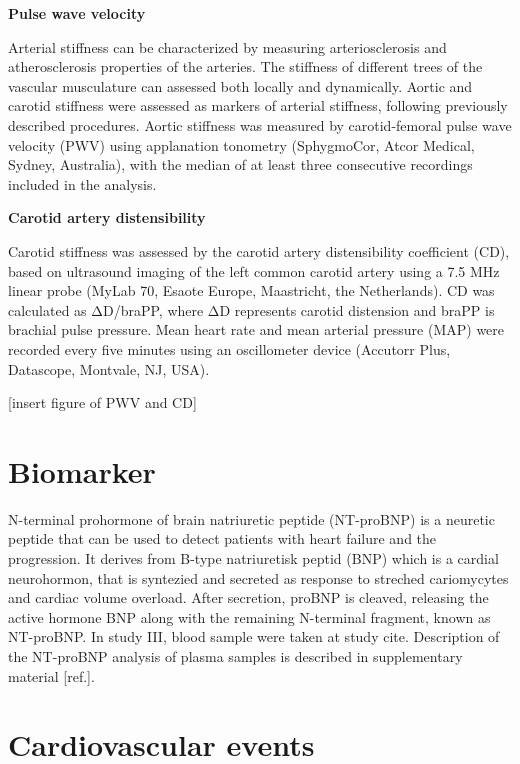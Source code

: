 \documentclass[
  a4paper,
  headsepline=true,
  open=any]{scrbook}
\begin{document}
\textbf{Pulse wave velocity}

Arterial stiffness can be characterized by measuring arteriosclerosis
and atherosclerosis properties of the arteries. The stiffness of
different trees of the vascular musculature can assessed both locally
and dynamically. Aortic and carotid stiffness were assessed as markers
of arterial stiffness, following previously described procedures. Aortic
stiffness was measured by carotid-femoral pulse wave velocity (PWV)
using applanation tonometry (SphygmoCor, Atcor Medical, Sydney,
Australia), with the median of at least three consecutive recordings
included in the analysis.

\textbf{Carotid artery distensibility}

Carotid stiffness was assessed by the carotid artery distensibility
coefficient (CD), based on ultrasound imaging of the left common carotid
artery using a 7.5 MHz linear probe (MyLab 70, Esaote Europe,
Maastricht, the Netherlands). CD was calculated as ΔD/braPP, where ΔD
represents carotid distension and braPP is brachial pulse pressure. Mean
heart rate and mean arterial pressure (MAP) were recorded every five
minutes using an oscillometer device (Accutorr Plus, Datascope,
Montvale, NJ, USA).

{[}insert figure of PWV and CD{]}

\hypertarget{biomarker}{%
\section{Biomarker}\label{biomarker}}

N-terminal prohormone of brain natriuretic peptide (NT-proBNP) is a
neuretic peptide that can be used to detect patients with heart failure
and the progression. It derives from B-type natriuretisk peptid (BNP)
which is a cardial neurohormon, that is syntezied and secreted as
response to streched cariomycytes and cardiac volume overload. After
secretion, proBNP is cleaved, releasing the active hormone BNP along
with the remaining N-terminal fragment, known as NT-proBNP. In study
III, blood sample were taken at study cite. Description of the NT-proBNP
analysis of plasma samples is described in supplementary material
{[}ref.{]}.

\hypertarget{cardiovascular-events}{%
\section{Cardiovascular events}\label{cardiovascular-events}}
\end{document}
